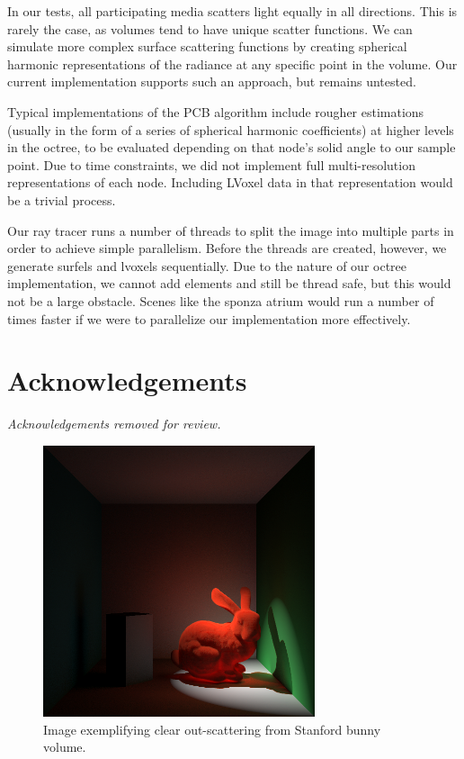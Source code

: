\documentclass[runningheads]{llncs}
\begin{document}
In our tests, all participating media scatters light equally in all directions.  This is rarely the case, as volumes tend to have unique scatter functions.  We can simulate more complex surface scattering functions by creating spherical harmonic representations of the radiance at any specific point in the volume.  Our current implementation supports such an approach, but remains untested.

Typical implementations of the PCB algorithm include rougher estimations (usually in the form of a series of spherical harmonic coefficients) at higher levels in the octree, to be evaluated depending on that node's solid angle to our sample point.  Due to time constraints, we did not implement full multi-resolution representations of each node.  Including LVoxel data in that representation would be a trivial process.

Our ray tracer runs a number of threads to split the image into multiple parts  in order to achieve simple parallelism.  Before the threads are created, however, we generate surfels and lvoxels sequentially.  Due to the nature of our octree implementation, we cannot add elements and still be thread safe, but this would not be a large obstacle.  Scenes like the sponza atrium would run a number of times faster if we were to parallelize our implementation more effectively.







\section*{Acknowledgements}
\textit{Acknowledgements removed for review.}



\begin{figure}[h!]
    \centering
    \includegraphics[width=80mm]{img/ketchup_good_corrected.png}
    \caption{Image exemplifying clear out-scattering from Stanford bunny volume.}
\end{figure}
\end{document}
